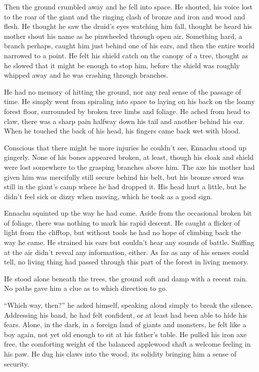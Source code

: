 Then the ground crumbled away and he fell into space. He shouted, his voice lost to the roar of the giant and the ringing clash of bronze and iron and wood and flesh. He thought he saw the druid's eyes watching him fall, thought he heard his mother shout his name as he pinwheeled through open air. Something hard, a branch perhaps, caught him just behind one of his ears, and then the entire world narrowed to a point. He felt his shield catch on the canopy of a tree, thought as he slowed that it might be enough to stop him, before the shield was roughly whipped away and he was crashing through branches.

He had no memory of hitting the ground, nor any real sense of the passage of time. He simply went from spiraling into space to laying on his back on the loamy forest floor, surrounded by broken tree limbs and foliage. He ached from head to claw, there was a sharp pain halfway down his tail and another behind his ear. When he touched the back of his head, his fingers came back wet with blood.

Conscious that there might be more injuries he couldn't see, Ennachu stood up gingerly. None of his bones appeared broken, at least, though his cloak and shield were lost somewhere to the grasping branches above him. The axe his mother had given him was mercifully still secure behind his belt, but his bronze sword was still in the giant's camp where he had dropped it. His head hurt a little, but he didn't feel sick or dizzy when moving, which he took as a good sign.

Ennachu squinted up the way he had come. Aside from the occasional broken bit of foliage, there was nothing to mark his rapid descent. He caught a flicker of light from the clifftop, but without tools he had no hope of climbing back the way he came. He strained his ears but couldn't hear any sounds of battle. Sniffing at the air didn't reveal any information, either. As far as any of his senses could tell, no living thing had passed through this part of the forest in living memory.

He stood alone beneath the trees, the ground soft and damp with a recent rain. No paths gave him a clue as to which direction to go.

``Which way, then?'' he asked himself, speaking aloud simply to break the silence. Addressing his band, he had felt confident, or at least had been able to hide his fears. Alone, in the dark, in a foreign land of giants and monsters, he felt like a boy again, not yet old enough to sit at his father's table. He pulled his iron axe free, the comforting weight of the balanced applewood shaft a welcome feeling in his paw. He dug his claws into the wood, its solidity bringing him a sense of security.


